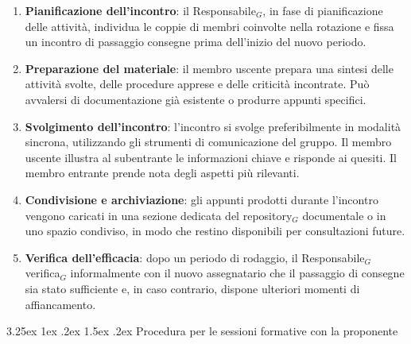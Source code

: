 \documentclass[a4paper, 10pt]{article}
\makeatletter
\renewcommand\paragraph{\@startsection{paragraph}{4}{\z@}%
  {3.25ex \@plus1ex \@minus .2ex}%
  {1.5ex \@plus .2ex}%
  {\normalfont\normalsize\bfseries}}
\makeatother
\begin{document}
\begin{enumerate}
    \item \textbf{Pianificazione dell'incontro}: il Responsabile$_G$, in fase di pianificazione delle attività, individua le coppie di membri coinvolte nella rotazione e fissa un incontro di passaggio consegne prima dell'inizio del nuovo periodo.
    \item \textbf{Preparazione del materiale}: il membro uscente prepara una sintesi delle attività svolte, delle procedure apprese e delle criticità incontrate. Può avvalersi di documentazione già esistente o produrre appunti specifici.
    \item \textbf{Svolgimento dell'incontro}: l'incontro si svolge preferibilmente in modalità sincrona, utilizzando gli strumenti di comunicazione del gruppo. Il membro uscente illustra al subentrante le informazioni chiave e risponde ai quesiti. Il membro entrante prende nota degli aspetti più rilevanti.
    \item \textbf{Condivisione e archiviazione}: gli appunti prodotti durante l'incontro vengono caricati in una sezione dedicata del repository$_G$ documentale o in uno spazio condiviso, in modo che restino disponibili per consultazioni future.
    \item \textbf{Verifica dell'efficacia}: dopo un periodo di rodaggio, il Responsabile$_G$ verifica$_G$ informalmente con il nuovo assegnatario che il passaggio di consegne sia stato sufficiente e, in caso contrario, dispone ulteriori momenti di affiancamento.
\end{enumerate}

\paragraph{Procedura per le sessioni formative con la proponente}
\end{document}
